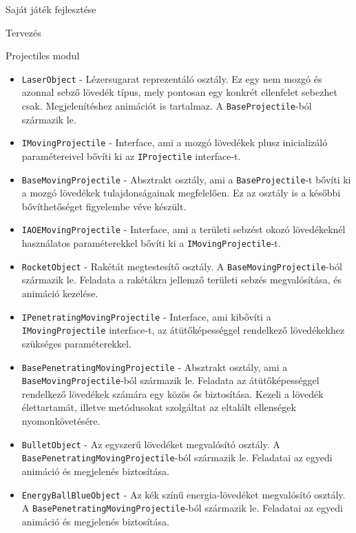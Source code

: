 \begin{MyChapter}{Saját játék fejlesztése}
\begin{MySection}{Tervezés}
\begin{MySubSection}{Projectiles modul}
\begin{itemize}
				\item \texttt{LaserObject} - Lézersugarat reprezentáló osztály. Ez egy nem mozgó és azonnal sebző lövedék típus, mely pontosan egy konkrét ellenfelet sebezhet csak. Megjelenítéshez animációt is tartalmaz. A \texttt{BaseProjectile}-ból származik le.

				\item \texttt{IMovingProjectile} - Interface, ami a mozgó lövedékek plusz inicializáló paramétereivel bővíti ki az \texttt{IProjectile} interface-t.

				\item \texttt{BaseMovingProjectile} - Absztrakt osztály, ami a \texttt{BaseProjectile}-t bővíti ki a mozgó lövedékek tulajdonságainak megfelelően. Ez az osztály is a későbbi bővíthetőséget figyelembe véve készült.

				\item \texttt{IAOEMovingProjectile} - Interface, ami a területi sebzést okozó lövedékeknél használatos paraméterekkel bővíti ki a \texttt{IMovingProjectile}-t.

				\item \texttt{RocketObject} - Rakétát megtestesítő osztály. A \texttt{BaseMovingProjectile}-ból származik le. Feladata a rakétákra jellemző területi sebzés megvalósítása, és animáció kezelése.

				\item \texttt{IPenetratingMovingProjectile} - Interface, ami kibővíti a \texttt{IMovingProjectile} interface-t, az átütőképességgel rendelkező lövedékekhez szükséges paraméterekkel.

				\item \texttt{BasePenetratingMovingProjectile} - Absztrakt osztály, ami a \texttt{Base\-Moving\-Projectile}-ból származik le. Feladata az átütőképességgel rendelkező lövedékek számára egy közös ős biztosítása. Kezeli a lövedék élettartamát, illetve metódusokat szolgáltat az eltalált ellenségek nyomonkövetésére.

				\item \texttt{BulletObject} - Az egyszerű lövedéket megvalósító osztály. A \texttt{Base\-Penetrating\-Moving\-Projectile}-ból származik le. Feladatai az egyedi animáció és megjelenés biztosítása.

				\item \texttt{EnergyBallBlueObject} - Az kék színű energia-lövedéket megvalósító osztály. A \texttt{Base\-Penetrating\-Moving\-Projectile}-ból származik le. Feladatai az egyedi animáció és megjelenés biztosítása.


\end{itemize}
\end{MySubSection}
\end{MySection}
\end{MyChapter}
